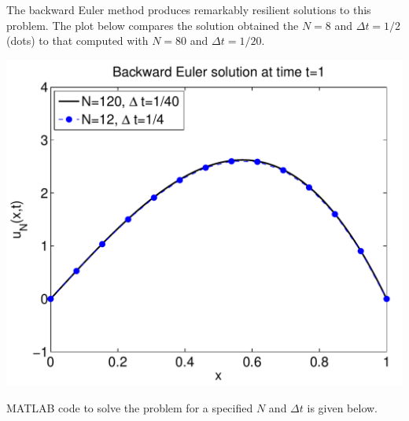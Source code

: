 {\begin{solution}
\begin{enumerate}
      The backward Euler method produces remarkably resilient solutions
      to this problem.
      The plot below compares the solution obtained the $N=8$ 
      and $\Delta t = 1/2$ (dots) to that
      computed with $N=80$ and $\Delta t = 1/20$.

\begin{center}
\includegraphics[scale=0.6]{femex1sol}
\end{center}

     MATLAB code to solve the problem for a specified $N$ and $\Delta t$
     is given below.


\end{enumerate}
\end{solution}}{}

